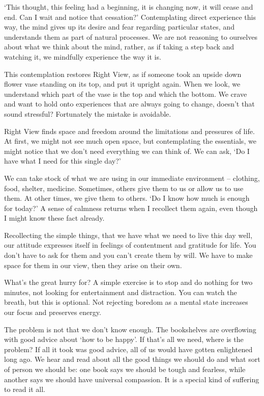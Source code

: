 `This thought, this feeling had a beginning, it is changing now, it will
cease and end. Can I wait and notice that cessation?' Contemplating
direct experience this way, the mind gives up its desire and fear
regarding particular states, and understands them as part of natural
processes. We are not reasoning to ourselves about what we think about
the mind, rather, as if taking a step back and watching it, we mindfully
experience the way it is.

\enlargethispage*{2\baselineskip}

This contemplation restores Right View, as if someone took an upside
down flower vase standing on its top, and put it upright again. When we
look, we understand which part of the vase is the top and which the
bottom. We crave and want to hold onto experiences that are always going
to change, doesn't that sound stressful? Fortunately the mistake is
avoidable.

\clearpage


Right View finds space and freedom around the limitations and pressures
of life. At first, we might not see much open space, but contemplating
the essentials, we might notice that we don't need everything we can
think of. We can ask, `Do I have what I need for this single day?'

We can take stock of what we are using in our immediate environment --
clothing, food, shelter, medicine. Sometimes, others give them to us or
allow us to use them. At other times, we give them to others. `Do I know
how much is enough for today?' A sense of calmness returns when I
recollect them again, even though I might know these fact already.

Recollecting the simple things, that we have what we need to live this
day well, our attitude expresses itself in feelings of contentment and
gratitude for life. You don't have to ask for them and you can't create
them by will. We have to make space for them in our view, then they
arise on their own.

What's the great hurry for? A simple exercise is to stop and do nothing
for two minutes, not looking for entertainment and distraction. You can
watch the breath, but this is optional. Not rejecting boredom as a
mental state increases our focus and preserves energy.

The problem is not that we don't know enough. The bookshelves are
overflowing with good advice about `how to be happy'. If that's all we
need, where is the problem? If all it took was good advice, all of us
would have gotten enlightened long ago. We hear and read about all the
good things we should do and what sort of person we should be: one book
says we should be tough and fearless, while another says we should have
universal compassion. It is a special kind of suffering to read it all.

